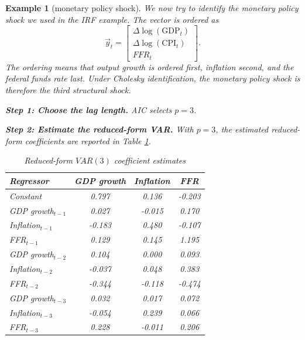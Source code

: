 \documentclass[12pt]{article}
\newtheorem{example}{Example}
\begin{document}
\begin{example}[monetary policy shock]
We now try to identify the monetary policy shock we used in the IRF example. The vector is ordered as
\[
    \vec{y}_t =
    \begin{bmatrix}
        \Delta \log(\text{GDP}_t)\\
        \Delta \log(\text{CPI}_t)\\
        FFR_t
    \end{bmatrix}.
\]
The ordering means that output growth is ordered first, inflation second, and the federal funds rate last. Under Cholesky identification, the monetary policy shock is therefore the third structural shock.

\textbf{Step 1: Choose the lag length.} AIC selects $p=3$.

\textbf{Step 2: Estimate the reduced-form VAR.} With $p=3$, the estimated reduced-form coefficients are reported in Table \ref{tab:var-regression-result}.

\begin{table}[H]
    \centering
    \caption{Reduced-form $VAR(3)$ coefficient estimates}
    \label{tab:var-regression-result}
    \begin{tabular}{lccc}
        \toprule
        Regressor & GDP growth & Inflation & FFR \\
        \midrule
        Constant & 0.797 & 0.136 & -0.203 \\
        GDP growth$_{t-1}$ & 0.027 & -0.015 & 0.170 \\
        Inflation$_{t-1}$ & -0.183 & 0.480 & -0.107 \\
        FFR$_{t-1}$ & 0.129 & 0.145 & 1.195 \\
        GDP growth$_{t-2}$ & 0.104 & 0.000 & 0.093 \\
        Inflation$_{t-2}$ & -0.037 & 0.048 & 0.383 \\
        FFR$_{t-2}$ & -0.344 & -0.118 & -0.474 \\
        GDP growth$_{t-3}$ & 0.032 & 0.017 & 0.072 \\
        Inflation$_{t-3}$ & -0.054 & 0.239 & 0.066 \\
        FFR$_{t-3}$ & 0.228 & -0.011 & 0.206 \\
        \bottomrule
    \end{tabular}
\end{table}


\end{example}
\end{document}

